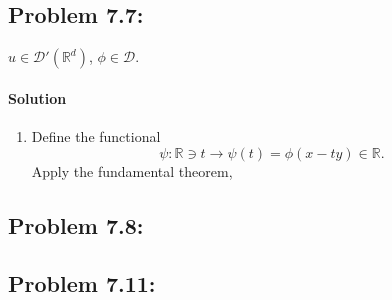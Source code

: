 \documentclass[letterpaper,twoside,11pt]{article}
\theoremstyle{mystyle}
\newcommand{\R}{{\mathbb R}}
\begin{document}
\subsection*{Problem 7.7:}
$u \in \mathcal D'\left( \R^d \right)$, $\phi \in \mathcal D$. 
\paragraph*{Solution}
\begin{enumerate}
  \item Define the functional 
  \[\psi:\R\ni t \to \psi(t) = \phi(x-ty) \in \R.\]
  Apply the fundamental theorem, 
\end{enumerate}




\subsection*{Problem 7.8:}
\subsection*{Problem 7.11:}
\end{document}
